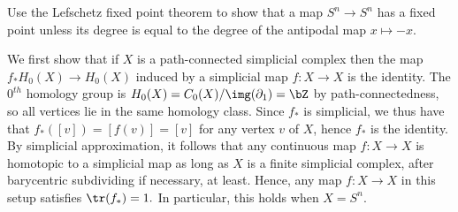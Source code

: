 \newpage
{}
\begin{homework}[e]
   Use the Lefschetz fixed point theorem to show that a map $S^n \to S^n$ has a fixed point unless its degree is equal to the degree of the antipodal map $x \mapsto -x$.
  \begin{prf}
    We first show that if $X$ is a path-connected simplicial complex then the map $f_*H_0(X)\to H_0(X)$ induced by a simplicial map $f:X\to X$ is the identity. The $0^{th}$ homology group is $H_0(X) = C_0(X)/\img(\partial_1) = \bZ$ by path-connectedness, so all vertices lie in the same homology class. Since $f_*$ is simplicial, we thus have that $f_*([v]) = [f(v)] = [v]$ for any vertex $v$ of $X$, hence $f_*$ is the identity. By simplicial approximation, it follows that any continuous map $f:X\to X$ is homotopic to a simplicial map as long as $X$ is a finite simplicial complex, after barycentric subdividing if necessary, at least. Hence, any map $f:X\to X$ in this setup satisfies $\tr(f_*) = 1.$ In particular, this holds when $X = S^n$.


\end{prf}
\end{homework}
